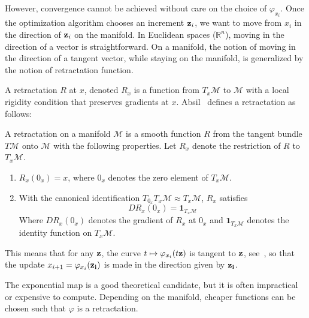 However, convergence cannot be achieved without care on the choice of $\varphi_{x_i}$.
Once the optimization algorithm chooses an increment ${\bf z}_i$, we want to move from $x_i$ in the direction of ${\bf z}_i$ on the manifold.
In Euclidean spaces ($\mathbb{R}^n$), moving in the direction of a vector is straightforward.
On a manifold, the notion of moving in the direction of a tangent vector, while staying on the manifold, is generalized by the notion of retractation function.

A retractation $R$ at $x$, denoted $R_x$ is a function from $T_x{\mathcal{M}}$ to $\mathcal{M}$ with a local rigidity condition that preserves gradients at $x$.
Absil~\cite{absil:book:2008} defines a retractation as follows:
\begin{definition}
A retractation on a manifold $\mathcal{M}$ is a smooth function $R$ from the tangent bundle $T\mathcal{M}$ onto $\mathcal{M}$ with the following properties.
Let $R_x$ denote the restriction of $R$ to $T_x\mathcal{M}$.
\begin{enumerate}
  \item $R_x(0_x) = x$, where $0_x$ denotes the zero element of $T_x\mathcal{M}$.
  \item With the canonical identification $T_{0_x}T_x\mathcal{M}\approx T_x\mathcal{M}$, $R_x$ satisfies
  \begin{equation}
    DR_x(0_x) = \mathbf{1}_{T_x\mathcal{M}}
  \end{equation}
  Where $DR_x(0_x)$ denotes the gradient of $R_x$ at $0_x$ and $\mathbf{1}_{T_x\mathcal{M}}$ denotes the identity function on $T_x\mathcal{M}$.
\end{enumerate}
\end{definition}

This means that for any ${\bf z}$, the curve $t \mapsto \varphi_{x_i}(t{\bf z})$ is tangent to ${\bf z}$, see~, so that the update $x_{i+1} = \varphi_{x_i}({\bf z_i})$ is made in the direction given by ${\bf z_i}$.

The exponential map is a good theoretical candidate, but it is often impractical or expensive to compute.
Depending on the manifold, cheaper functions can be chosen such that $\varphi$ is a retractation.

